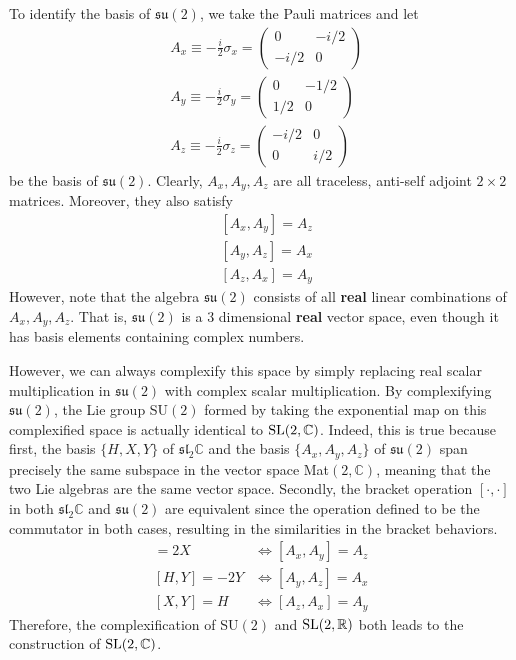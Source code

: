    To identify the basis of $\mathfrak{su}(2)$, we take the Pauli matrices and let 
    \begin{align*}
      & A_x \equiv - \frac{i}{2} \sigma_x = \begin{pmatrix} 0&-i/2\\-i/2&0 \end{pmatrix} \\
      & A_y \equiv - \frac{i}{2} \sigma_y = \begin{pmatrix}0&-1/2\\1/2&0\end{pmatrix} \\
      & A_z \equiv -\frac{i}{2} \sigma_z = \begin{pmatrix}-i/2&0\\0&i/2\end{pmatrix}
    \end{align*} 
    be the basis of $\mathfrak{su}(2)$. Clearly, $A_x, A_y, A_z$ are all traceless, anti-self adjoint $2 \times 2$ matrices. Moreover, they also satisfy
    \begin{align*}
      & [A_x, A_y] = A_z \\
      & [A_y, A_z] = A_x \\
      & [A_z, A_x] = A_y
    \end{align*}
    However, note that the algebra $\mathfrak{su}(2)$ consists of all \textbf{real} linear combinations of $A_x, A_y, A_z$. That is, $\mathfrak{su}(2)$ is a 3 dimensional \textbf{real} vector space, even though it has basis elements containing complex numbers. 

    However, we can always complexify this space by simply replacing real scalar multiplication in $\mathfrak{su}(2)$ with complex scalar multiplication. By complexifying $\mathfrak{su}(2)$, the Lie group SU$(2)$ formed by taking the exponential map on this complexified space is actually identical to $\operatorname{SL}(2, \mathbb{C})$. Indeed, this is true because first, the basis $\{H, X, Y\}$ of $\mathfrak{sl}_2 \mathbb{C}$ and the basis $\{A_x, A_y, A_z\}$ of $\mathfrak{su}(2)$ span precisely the same subspace in the vector space Mat$(2, \mathbb{C})$, meaning that the two Lie algebras are the same vector space. Secondly, the bracket operation $[\cdot, \cdot]$ in both $\mathfrak{sl}_2 \mathbb{C}$ and $\mathfrak{su}(2)$ are equivalent since the operation defined to be the commutator in both cases, resulting in the similarities in the bracket behaviors. 
    \begin{align*}
      [H,X] = 2X & \iff [A_x, A_y] = A_z \\
      [H,Y] = - 2Y & \iff [A_y, A_z] = A_x\\
      [X,Y] = H & \iff  [A_z, A_x] = A_y 
    \end{align*}
    Therefore, the complexification of SU$(2)$ and $\operatorname{SL}(2, \mathbb{R})$ both leads to the construction of $\operatorname{SL}(2, \mathbb{C})$. 

